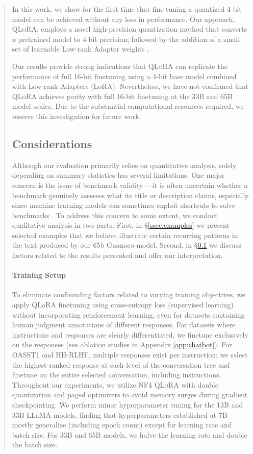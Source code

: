 \begin{quote}
In this work, we show for the first time that fine-tuning a quantized 4-bit model can be achieved without any loss in performance. Our approach, \textsc{QLoRA}, employs a novel high-precision quantization method that converts a pretrained model to 4-bit precision, followed by the addition of a small set of learnable Low-rank Adapter weights \citep{hu2021lora}, 

Our results provide strong indications that \textsc{QLoRA} can replicate the performance of full 16-bit finetuning using a 4-bit base model combined with Low-rank Adapters (LoRA). Nevertheless, we have not confirmed that \textsc{QLoRA} achieves parity with full 16-bit finetuning at the 33B and 65B model scales. Due to the substantial computational resources required, we reserve this investigation for future work.

\subsection{Considerations}
\label{ssec:considerations}

Although our evaluation primarily relies on quantitative analysis, solely depending on summary statistics has several limitations. One major concern is the issue of benchmark validity \citep{liao2021we}—it is often uncertain whether a benchmark genuinely assesses what its title or description claims, especially since machine learning models can sometimes exploit shortcuts to solve benchmarks \citep{gururangan2018annotation, poliak2018hypothesis}. To address this concern to some extent, we conduct qualitative analysis in two parts. First, in \S\ref{ssec:examples} we present selected examples that we believe illustrate certain recurring patterns in the text produced by our 65b {Guanaco} model. Second, in \S\ref{ssec:considerations} we discuss factors related to the results presented and offer our interpretation.

\paragraph{Training Setup} To eliminate confounding factors related to varying training objectives, we apply QLoRA finetuning using cross-entropy loss (supervised learning) without incorporating reinforcement learning, even for datasets containing human judgment annotations of different responses. For datasets where instructions and responses are clearly differentiated, we finetune exclusively on the responses (see ablation studies in Appendix \ref{app:chatbot}). For OASST1 and HH-RLHF, multiple responses exist per instruction; we select the highest-ranked response at each level of the conversation tree and finetune on the entire selected conversation, including instructions. Throughout our experiments, we utilize NF4 \textsc{QLoRA} with double quantization and paged optimizers to avoid memory surges during gradient checkpointing. We perform minor hyperparameter tuning for the 13B and 33B LLaMA models, finding that hyperparameters established at 7B mostly generalize (including epoch count) except for learning rate and batch size. For 33B and 65B models, we halve the learning rate and double the batch size.


\end{quote}
